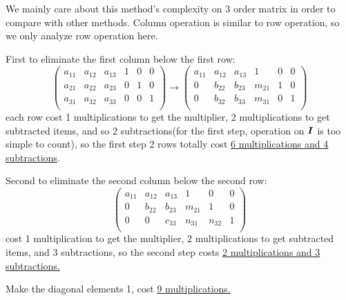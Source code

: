 \documentclass{overview}
\begin{document}
We mainly care about this method's complexity on 3 order matrix in order to compare
with other methods. Column operation is similar to row operation, so we only analyze
row operation here.

First to eliminate the first column below the first row: 
 \[
	 \left( \begin{array}{ccc|ccc}
		a_{11} & a_{12} & a_{13} &  1 & 0 & 0 \\
		a_{21} & a_{22} & a_{23} &  0 & 1 & 0 \\
		a_{31} & a_{32} & a_{33} &  0 & 0 & 1 \\
	\end{array}\right)
	\rightarrow
	\left( \begin{array}{ccc|ccc}
		a_{11} & a_{12} & a_{13} &  1 & 0 & 0 \\
		0      & b_{22} & b_{23} &  m_{21} & 1 & 0 \\
		0      & b_{32} & b_{33} &  m_{31} & 0 & 1 \\
	\end{array} \right)
\] 
each row cost 1 multiplications to get the multiplier, 2 multiplications to get
subtracted items, and so 2 subtractions(for the first step, operation on $\boldsymbol{I}$ is
too simple to count), so
the first step 2 rows totally cost \underline{6 multiplications and 4 subtractions}.

Second to eliminate the second column below the second row:
 \[
	 \left( \begin{array}{ccc|ccc}
		a_{11} & a_{12} & a_{13} &  1 & 0 & 0 \\
		0      & b_{22} & b_{23} &  m_{21} & 1 & 0 \\
		0			& 0      & c_{33} &  n_{31} & n_{32} & 1 \\
	\end{array}\right)
\]
cost 1 multiplication to get the multiplier, 2 multiplications to get
subtracted items, and 3 subtractions, so the second step costs 
\underline{2 multiplications and 3 subtractions.}

Make the diagonal elements 1, cost \underline{9 multiplications.}
\end{document}
